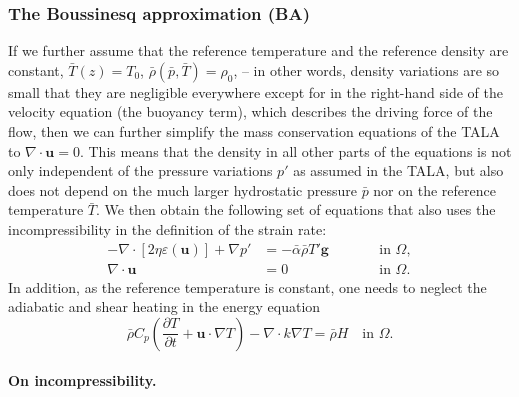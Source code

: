 \documentclass{article}
\begin{document}
\subsubsection{The Boussinesq approximation (BA)}
\label{sec:Boussinesq}

If we further assume that the reference temperature and the reference density are constant,
$\bar T(z)=T_0$, $\bar\rho(\bar p,\bar T)=\rho_0$,
-- in other words, density variations are so small that
they are negligible everywhere except for in the right-hand side of the velocity
equation (the buoyancy term), which describes the driving force of the flow,
then we can further simplify the mass conservation equations of the
TALA to $\nabla \cdot \mathbf u=0$.
This means that the density in all other parts of the equations is not only independent of
the pressure variations $p'$ as assumed in the TALA, but also does not depend on
the much larger hydrostatic pressure $\bar p$ nor on the reference temperature
$\bar T$. We then obtain the following set of
equations that also uses the incompressibility in the definition of the strain rate:
\begin{align}
  \label{eq:stokes-BA-1}
  -\nabla \cdot \left[2\eta \varepsilon(\mathbf u)
                \right] + \nabla p' &=
  -\bar \alpha \bar\rho T' \mathbf g
  & \qquad
  & \textrm{in $\Omega$},
  \\
  \label{eq:stokes-BA-2}
  \nabla \cdot \mathbf u &= 0
  & \qquad
  & \textrm{in $\Omega$}.
\end{align}
In addition, as the reference temperature is constant, one needs to neglect the
adiabatic and shear heating in the energy equation
\begin{equation}
  \label{eq:temperature-BA}
  \bar\rho C_p \left(\frac{\partial T}{\partial t} + \mathbf u\cdot\nabla
  T\right) - \nabla\cdot k\nabla T
  =
  \bar\rho H
  \quad
  \textrm{in $\Omega$}.
\end{equation}

\paragraph*{On incompressibility.}
\end{document}
